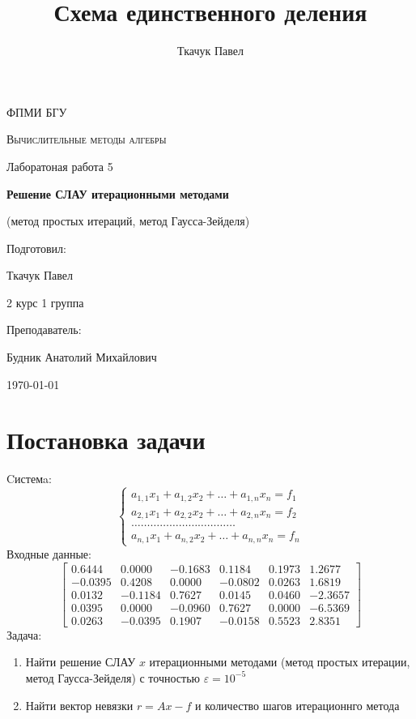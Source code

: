 \documentclass[11.4pt]{article}
\author{Ткачук Павел}
\title{Схема единственного деления}
\begin{document}
	\begin{titlepage}
		
		\centering
		{\scshape\LARGE ФПМИ БГУ \par}
		\vfill
		\begin{flushleft}
		{\scshape\Large Вычислительные методы алгебры\par Лаборатоная работа 5 \par}
		\vspace{1cm}
		{\huge\bfseries Решение СЛАУ итерационными методами\par}
		{\large(метод простых итераций, метод Гаусса-Зейделя)}
		\end{flushleft}
		\vspace{10cm}
		\begin{flushright}
		\large
		Подготовил:\par
		Ткачук Павел\par
		2 курс 1 группа\par
		\vspace{0.5cm}
		Преподаватель:\par
		Будник Анатолий Михайлович
		\end{flushright}
		
		\vfill
		{\large \today}
	\end{titlepage}
\section{Постановка задачи}
	Cистемa:
	\begin{equation}\label{first}
		\left\{
			\begin{array}{c}
				a_{1,1} x_1 + a_{1,2} x_2 + \ldots + a_{1,n} x_n = f_1  \\
				a_{2,1} x_1 + a_{2,2} x_2 + \ldots + a_{2,n} x_n = f_2  \\
				\dots\dots\dots\dots\dots\dots\dots\dots\dots\dots\dots  \\
				a_{n,1} x_1 + a_{n,2} x_2 + \ldots + a_{n,n} x_n = f_n  
			\end{array}
		\right.
	\end{equation}
	Входные данные:
	\[
		\left[
			\begin{array}{ccccc|c}
				0.6444 & 0.0000 & -0.1683 & 0.1184 & 0.1973 & 1.2677\\
				-0.0395 & 0.4208 & 0.0000 & -0.0802 & 0.0263 & 1.6819\\
				0.0132  & -0.1184 & 0.7627 & 0.0145 & 0.0460 & -2.3657\\
				0.0395 & 0.0000 & -0.0960 & 0.7627 & 0.0000 & -6.5369\\
				0.0263 & -0.0395 & 0.1907 & -0.0158 & 0.5523 & 2.8351
			\end{array}
		\right]
	\]
	Задача:
	\begin{enumerate}
		\item Найти решение СЛАУ $x$ итерационными методами (метод простых итерации, метод Гаусса-Зейделя) с точностью $\varepsilon=10^{-5}$
		\item Найти вектор невязки $r = Ax-f$ и количество шагов итерационнго метода
	\end{enumerate}
\end{document}
